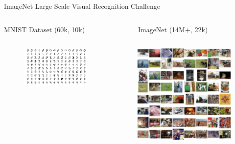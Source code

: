 \begin{frame}{ImageNet Large Scale Visual Recognition Challenge}
	\begin{columns}
		\begin{column}{.5\textwidth}
			\begin{center}
				MNIST Dataset (60k, 10k)
			\end{center}
		\end{column}
		\begin{column}{.5\textwidth}
			\begin{center}
				ImageNet (14M+, 22k)
			\end{center}
		\end{column}
	\end{columns}
	\begin{columns}
		\begin{column}{.5\textwidth}
			\begin{figure}
				\includegraphics[width=1\textwidth, center]{figures/MnistExamples}
				\caption*{}
			\end{figure}
		\end{column}
		\begin{column}{.5\textwidth}
			\begin{figure}
			\includegraphics[width=.8\textwidth, center]{figures/Examples-in-the-ImageNet-dataset}
			\caption*{}
		\end{figure}
		\end{column}
	\end{columns}
\end{frame}

